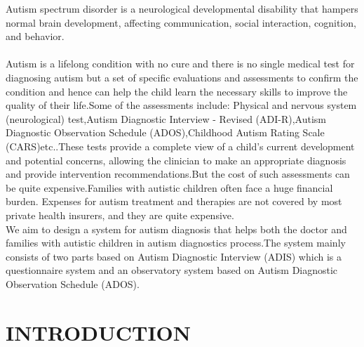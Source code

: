 Autism spectrum disorder is a neurological developmental disability that hampers normal brain development, affecting communication, social interaction, cognition, and behavior.\\
\\Autism is a lifelong condition with no cure and there is no single medical test for diagnosing autism but a set of specific evaluations and assessments to confirm the condition and hence can help the child learn the necessary skills to improve the quality of their life.Some of the assessments include: Physical and nervous system (neurological) test,Autism Diagnostic Interview - Revised  (ADI-R),Autism Diagnostic Observation Schedule (ADOS),Childhood Autism Rating Scale (CARS)etc..These tests provide a complete view of a child’s current development and potential concerns, allowing the clinician to make an appropriate diagnosis and provide intervention recommendations.But the cost of such assessments can be quite expensive.Families with autistic children often face a huge financial burden. Expenses for autism treatment and therapies are not covered by most private health insurers, and they are quite expensive.\\
We aim to design a system for autism diagnosis that helps both the doctor and families with autistic children in autism diagnostics process.The  system mainly consists of two parts based on Autism Diagnostic Interview (ADIS) which is a questionnaire system and an observatory system based on Autism Diagnostic Observation Schedule (ADOS).

%       
%
\tableofcontents
{}
\listoffigures
{}
\listoftables

\mainmatter



\chapter {INTRODUCTION}

